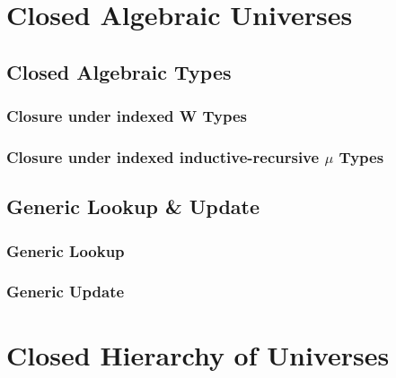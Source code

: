 \documentclass[12pt]{report}
\theoremstyle{definition}
\theoremstyle{remark}
\numberwithin{definition}{section}
\numberwithin{equation}{section}
\numberwithin{proposition}{section}
\numberwithin{conjecture}{section}
\numberwithin{theorem}{section}
\numberwithin{lemma}{section}
\numberwithin{corollary}{section}
\numberwithin{example}{section}
\numberwithin{remark}{section}
\begin{document}

\part{Closed Algebraic Universes}\label{part:closed}




\chapter{Closed Algebraic Types}\label{ch:closed}
\section{Closure under indexed W Types}
\section{Closure under indexed inductive-recursive $\mu$ Types}

\chapter{Generic Lookup \& Update}\label{ch:gupdate}
\section{Generic Lookup}
\section{Generic Update}



\part{Closed Hierarchy of Universes}\label{part:hier}
\end{document}
